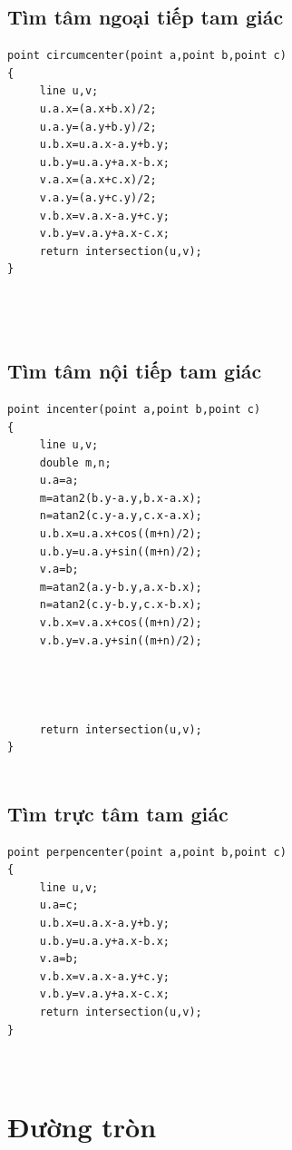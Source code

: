 \documentclass[11pt]{article}
\begin{document}
\subsection{Tìm tâm ngoại tiếp tam giác}
\begingroup
\scriptsize
\begin{verbatim}
point circumcenter(point a,point b,point c)
{
     line u,v;
     u.a.x=(a.x+b.x)/2;
     u.a.y=(a.y+b.y)/2;
     u.b.x=u.a.x-a.y+b.y;
     u.b.y=u.a.y+a.x-b.x;
     v.a.x=(a.x+c.x)/2;
     v.a.y=(a.y+c.y)/2;
     v.b.x=v.a.x-a.y+c.y;
     v.b.y=v.a.y+a.x-c.x;
     return intersection(u,v);
}




\end{verbatim}
\endgroup
\subsection{Tìm tâm nội tiếp tam giác}
\begingroup
\scriptsize
\begin{verbatim}
point incenter(point a,point b,point c)
{
     line u,v;
     double m,n;
     u.a=a;
     m=atan2(b.y-a.y,b.x-a.x);
     n=atan2(c.y-a.y,c.x-a.x);
     u.b.x=u.a.x+cos((m+n)/2);
     u.b.y=u.a.y+sin((m+n)/2);
     v.a=b;
     m=atan2(a.y-b.y,a.x-b.x);
     n=atan2(c.y-b.y,c.x-b.x);
     v.b.x=v.a.x+cos((m+n)/2);
     v.b.y=v.a.y+sin((m+n)/2);




     return intersection(u,v);
}


\end{verbatim}
\endgroup
\subsection{Tìm trực tâm tam giác}
\begingroup
\scriptsize
\begin{verbatim}
point perpencenter(point a,point b,point c)
{
     line u,v;
     u.a=c;
     u.b.x=u.a.x-a.y+b.y;
     u.b.y=u.a.y+a.x-b.x;
     v.a=b;
     v.b.x=v.a.x-a.y+c.y;
     v.b.y=v.a.y+a.x-c.x;
     return intersection(u,v);
}



\end{verbatim}
\endgroup
\section{Đường tròn}
\end{document}
